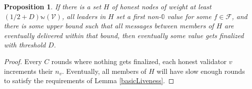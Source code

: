 \documentclass[12pt, fleqn]{article}
\newtheorem{proposition}{Proposition}
\newcommand{\ww}{\mathbb{w}}
\begin{document}
\begin{proposition}
  If there is a set $H$ of honest nodes of weight at least $(1/2 + D) \ww(\mathcal{V})$, all leaders in $H$ set a first non-$\mathbb{0}$ value for some $f \in \mathcal{F}$, and there is some upper bound such that all messages between members of $H$ are eventually delivered within that bound, then eventually some value gets finalized with threshold $D$.
\end{proposition}

\begin{proof}
  Every $C$ rounds where nothing gets finalized, each honest validator $v$ increments their $n_v$. Eventually, all members of $H$ will have slow enough rounds to satisfy the requirements of Lemma \ref{basicLiveness}.
\end{proof}
\end{document}
